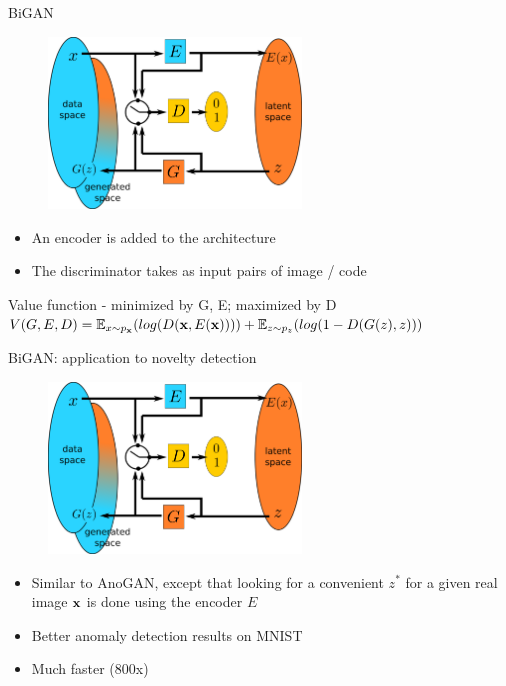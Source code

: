 \documentclass[xcolor=pdftex,dvipsnames,table,mathserif]{beamer}
\begin{document}
\begin{frame}{BiGAN}

  \begin{figure}[ht]
    \centering
    \includegraphics[width=0.6\textwidth]{bigan}
  \end{figure}

  \begin{itemize}
  \item An encoder is added to the architecture
  \item The discriminator takes as input pairs of image / code
  \end{itemize}

    \begin{block}{Value function - minimized by G, E; maximized by D}
    $V(G, E, D) = \mathbb{E}_{x \sim p_{\mathbf{x}}}(log(D(\mathbf{x}, E(\mathbf{x})))) + \mathbb{E}_{z \sim p_z}(log(1 - D(G(z), z)))$
  \end{block}


\end{frame}

\begin{frame}{BiGAN: application to novelty detection \cite{zenati_efficient_2018}}

  \begin{figure}[ht]
    \centering
    \includegraphics[width=0.6\textwidth]{bigan}
  \end{figure}

  \begin{itemize}
  \item Similar to AnoGAN, except that looking for a convenient $z^*$ for a given real image $\mathbf{x}$ is done using the encoder $E$
  \item Better anomaly detection results on MNIST
  \item Much faster (800x)
  \end{itemize}


\end{frame}
\end{document}
